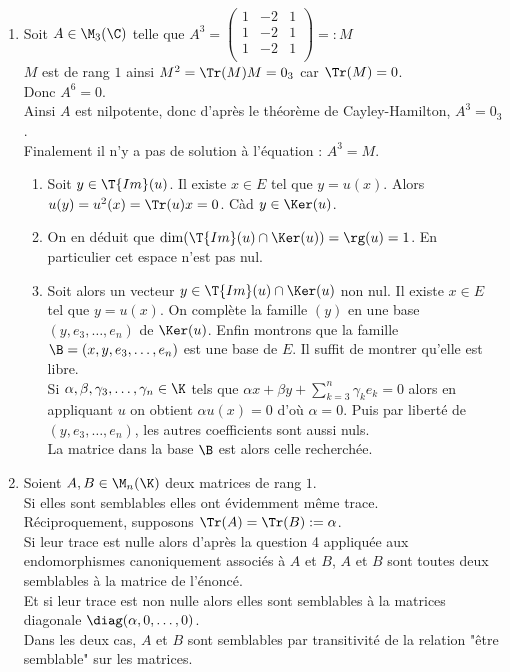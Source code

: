 \documentclass[8pt]{book}
\begin{document}
\begin{enumerate}
\begin{itemize}
		\end{itemize}
		On conclut donc que $M$ est diagonalisable ssi $\Tr(M)\ne0$.
		\item Soit $A\in \M_3(\C)$ telle que $A^3=\begin{pmatrix}
			1 &-2 &1\\
			1 &-2 &1\\
			1 &-2 &1\\
		\end{pmatrix}=:M$
		\\$M$ est de rang $1$ ainsi $M^2=\Tr(M)M=0_3$ car $\Tr(M)=0$.
		\\Donc $A^6=0$.
		\\Ainsi $A$ est nilpotente, donc d'après le théorème de Cayley-Hamilton, $A^3=0_3$.
		\\Finalement il n'y a pas de solution à l'équation : $A^3=M$.
		\begin{enumerate}[label=\alph*.]
			\item Soit $y\in \T{Im}(u)$. Il existe $x\in E$ tel que $y=u(x)$. Alors $u(y)=u^2(x)=\Tr(u)x=0$. Càd $y\in \Ker(u)$.
			\item On en déduit que $\dim(\T{Im}(u)\cap\Ker(u))=\rg(u)=1$. En particulier cet espace n'est pas nul.
			\item Soit alors un vecteur $y\in \T{Im}(u)\cap\Ker(u)$ non nul. Il existe $x\in E$ tel que $y=u(x)$. On complète la famille $(y)$ en une base $(y,e_3,\dots,e_n)$ de $\Ker(u)$. Enfin montrons que la famille $\B=(x,y,e_3,\dots,e_n)$ est une base de $E$. Il suffit de montrer qu'elle est libre.\\
			Si $\alpha,\beta,\gamma_3,\dots,\gamma_n\in \K$ tels que $\alpha x+\beta y+\displaystyle\sum_{k=3}^n\gamma_ke_k=0$ alors en appliquant $u$ on obtient $\alpha u(x)=0$ d'où $\alpha=0$. Puis par liberté de $(y,e_3,\dots,e_n)$, les autres coefficients sont aussi nuls.\\
			La matrice dans la base $\B$ est alors celle recherchée.
		\end{enumerate}
		\item Soient $A,B\in \M_n(\K)$ deux matrices de rang $1$.\\
		Si elles sont semblables elles ont évidemment même trace.\\
		Réciproquement, supposons $\Tr(A)=\Tr(B):=\alpha$.\\
		Si leur trace est nulle alors d'après la question 4 appliquée aux endomorphismes canoniquement associés à $A$ et $B$, $A$ et $B$ sont toutes deux semblables à la matrice de l'énoncé.\\
		Et si leur trace est non nulle alors elles sont semblables à la matrices diagonale $\diag(\alpha,0,\dots,0)$.\\
		Dans les deux cas, $A$ et $B$ sont semblables par transitivité de la relation "être semblable" sur les matrices.
	\end{enumerate}
	
\end{document}
